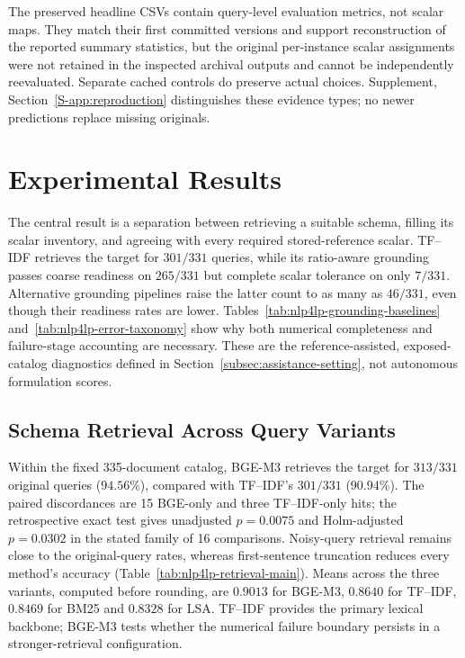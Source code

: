 \documentclass[pdflatex,sn-basic,Numbered]{sn-jnl}
\begin{document}
The preserved headline CSVs contain query-level evaluation metrics, not scalar maps. They match their first committed versions and support reconstruction of the reported summary statistics, but the original per-instance scalar assignments were not retained in the inspected archival outputs and cannot be independently reevaluated. Separate cached controls do preserve actual choices. Supplement, Section~\ref{S-app:reproduction} distinguishes these evidence types; no newer predictions replace missing originals.



\section{Experimental Results}
\label{sec:experiments}
The central result is a separation between retrieving a suitable schema, filling its scalar inventory, and agreeing with every required stored-reference scalar. TF--IDF retrieves the target for $301/331$ queries, while its ratio-aware grounding passes coarse readiness on $265/331$ but complete scalar tolerance on only $7/331$. Alternative grounding pipelines raise the latter count to as many as $46/331$, even though their readiness rates are lower. Tables~\ref{tab:nlp4lp-grounding-baselines} and~\ref{tab:nlp4lp-error-taxonomy} show why both numerical completeness and failure-stage accounting are necessary. These are the reference-assisted, exposed-catalog diagnostics defined in Section~\ref{subsec:assistance-setting}, not autonomous formulation scores.

\subsection{Schema Retrieval Across Query Variants}
\label{subsec:exp_retrieval}
Within the fixed 335-document catalog, BGE-M3 retrieves the target for $313/331$ original queries ($94.56\%$), compared with TF--IDF's $301/331$ ($90.94\%$). The paired discordances are 15 BGE-only and three TF--IDF-only hits; the retrospective exact test gives unadjusted $p=0.0075$ and Holm-adjusted $p=0.0302$ in the stated family of 16 comparisons. Noisy-query retrieval remains close to the original-query rates, whereas first-sentence truncation reduces every method's accuracy (Table~\ref{tab:nlp4lp-retrieval-main}). Means across the three variants, computed before rounding, are $0.9013$ for BGE-M3, $0.8640$ for TF--IDF, $0.8469$ for BM25 and $0.8328$ for LSA. TF--IDF provides the primary lexical backbone; BGE-M3 tests whether the numerical failure boundary persists in a stronger-retrieval configuration.
\end{document}
